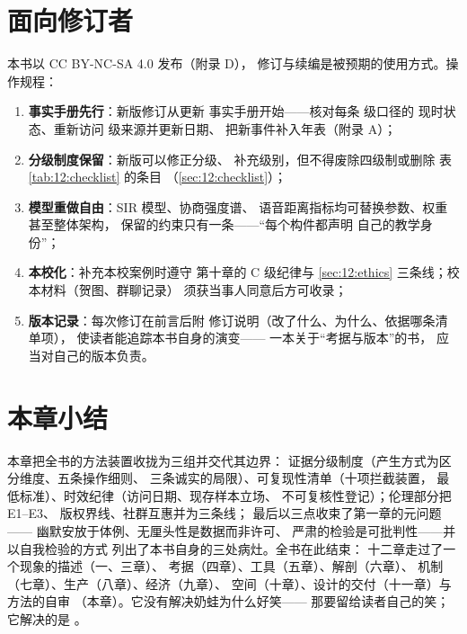 \section{面向修订者}\label{sec:12:revisers}

本书以 CC BY-NC-SA 4.0 发布（附录 D），
修订与续编是被预期的使用方式。操作规程：

\begin{enumerate}[label=\arabic*.]
  \item \textbf{事实手册先行}：新版修订从更新
        事实手册开始——核对每条  级口径的
        现时状态、重新访问  级来源并更新日期、
        把新事件补入年表（附录 A）；
  \item \textbf{分级制度保留}：新版可以修正分级、
        补充级别，但不得废除四级制或删除
        表 \ref{tab:12:checklist} 的条目
        （\ref{sec:12:checklist}）；
  \item \textbf{模型重做自由}：SIR 模型、协商强度谱、
        语音距离指标均可替换参数、权重甚至整体架构，
        保留的约束只有一条——“每个构件都声明
        自己的教学身份”；
  \item \textbf{本校化}：补充本校案例时遵守
        第十章的 C 级纪律与 \ref{sec:12:ethics}
        三条线；校本材料（贺图、群聊记录）
        须获当事人同意后方可收录；
  \item \textbf{版本记录}：每次修订在前言后附
        修订说明（改了什么、为什么、依据哪条清单项），
        使读者能追踪本书自身的演变——
        一本关于“考据与版本”的书，
        应当对自己的版本负责。
\end{enumerate}

\section{本章小结}\label{sec:12:summary}

本章把全书的方法装置收拢为三组并交代其边界：
证据分级制度（产生方式为区分维度、五条操作细则、
三条诚实的局限）、可复现性清单（十项拦截装置，
最低标准）、时效纪律（访问日期、现存样本立场、
不可复核性登记）；伦理部分把 E1--E3、
版权界线、社群互惠并为三条线；
最后以三点收束了第一章的元问题——
幽默安放于体例、无厘头性是数据而非许可、
严肃的检验是可批判性——并以自我检验的方式
列出了本书自身的三处病灶。全书在此结束：
十二章走过了一个现象的描述（一、三章）、
考据（四章）、工具（五章）、解剖（六章）、
机制（七章）、生产（八章）、经济（九章）、
空间（十章）、设计的交付（十一章）与方法的自审
（本章）。它没有解决奶蛙为什么好笑——
那要留给读者自己的笑；它解决的是
。

